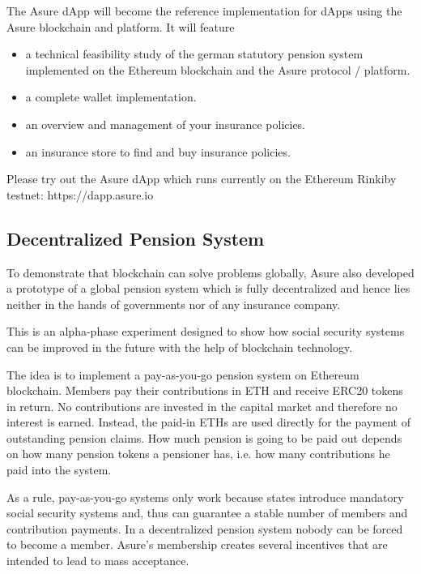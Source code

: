 The Asure dApp will become the reference implementation for dApps using the Asure blockchain and platform.
\newline\newline
It will feature
\begin{itemize}
\item a technical feasibility study of the german statutory pension system implemented on the Ethereum blockchain and the Asure protocol / platform.
\item a complete wallet implementation.
\item an overview and management of your insurance policies.
\item an insurance store to find and buy insurance policies.
\end{itemize}

Please try out the Asure dApp which runs currently on the Ethereum Rinkiby testnet: 
https://dapp.asure.io

\subsection{Decentralized Pension System}

To demonstrate that blockchain can solve problems globally, Asure also developed a prototype of a global pension system which is fully decentralized and hence lies neither in the hands of governments nor of any insurance company.

This is an alpha-phase experiment designed to show how social security systems can be improved in the future with the help of blockchain technology.

The idea is to implement a pay-as-you-go pension system on Ethereum blockchain. Members pay their contributions in ETH and receive ERC20 tokens in return. No contributions are invested in the capital market and therefore no interest is earned. Instead, the paid-in ETHs are used directly for the payment of outstanding pension claims. How much pension is going to be paid out depends on how many pension tokens a pensioner has, i.e. how many contributions he paid into the system.

As a rule, pay-as-you-go systems only work because states introduce mandatory social security systems and, thus can guarantee a stable number of members and contribution payments. In a decentralized pension system nobody can be forced to become a member. Asure's membership creates several incentives that are intended to lead to mass acceptance.

